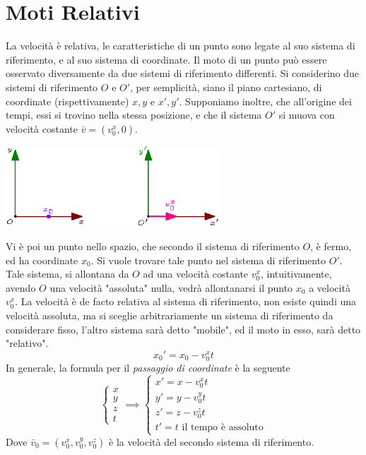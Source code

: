 \documentclass[10pt, letterpaper]{report}
\begin{document}
\section{Moti Relativi}
La velocità è relativa, le caratteristiche di un punto sono legate al suo sistema di riferimento, e 
al suo sistema di coordinate. Il moto di un punto può essere osservato diversamente da due sistemi 
di riferimento differenti.\acc 
Si considerino due sistemi di riferimento $O$ e $O'$, per semplicità, siano il piano cartesiano, di 
coordinate (rispettivamente) $x,y$ e $x',y'$. Supponiamo inoltre, che all'origine dei tempi, essi 
si trovino nella stessa posizione, e che il sistema $O'$ si muova con velocità costante $\bar v = (v_0^x,0)$.
\begin{center}
    \includegraphics[width=0.6\textwidth]{images/sistemiRif.eps}
    \end{center}
Vi è poi un punto nello spazio, che secondo il sistema di riferimento $O$, è fermo, ed ha coordinate $x_0$. 
Si vuole trovare tale punto nel sistema di riferimento $O'$. Tale sistema, si allontana da $O$ ad una 
velocità costante $v_0^x$, intuitivamente, avendo $O$ una velocità "assoluta" nulla,
 vedrà allontanarsi il punto $x_0$ a velocità $v_0^x$. La velocità è de facto relativa al sistema di riferimento, 
 non esiste quindi una velocità assoluta, ma si sceglie arbitrariamente un sistema di riferimento 
 da considerare fisso, l'altro sistema sarà detto "mobile", ed il moto in esso, sarà 
 detto "relativo". 
 $$x_0'=x_0-v_0^xt$$
In generale, la formula per il \textit{passaggio di coordinate} è la seguente
$$\begin{cases}
    x\\ y\\ z\\ t
\end{cases} \implies \begin{cases}
    x' = x-v_0^x t\\ 
    y' = y-v_0^y t\\ 
    z' = z-v_0^z t\\ 
    t'=t \text{ il tempo è assoluto}
\end{cases}$$
Dove $\bar v_0=(v_0^x,v_0^y,v_0^z)$ è la velocità del secondo sistema di riferimento.
\end{document}

